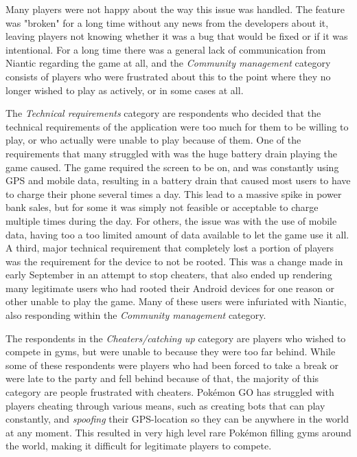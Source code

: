 Many players were not happy about the way this issue was handled. The feature was "broken" for a long time without any news from the developers about it, leaving players not knowing whether it was a bug that would be fixed or if it was intentional. For a long time there was a general lack of communication from Niantic regarding the game at all, and the \emph{Community management} category consists of players who were frustrated about this to the point where they no longer wished to play as actively, or in some cases at all.

The \emph{Technical requirements} category are respondents who decided that the technical requirements of the application were too much for them to be willing to play, or who actually were unable to play because of them. One of the requirements that many struggled with was the huge battery drain playing the game caused. The game required the screen to be on, and was constantly using GPS and mobile data, resulting in a battery drain that caused most users to have to charge their phone several times a day. This lead to a massive spike in power bank sales, but for some it was simply not feasible or acceptable to charge multiple times during the day. For others, the issue was with the use of mobile data, having too a too limited amount of data available to let the game use it all. A third, major technical requirement that completely lost a portion of players was the requirement for the device to not be rooted. This was a change made in early September in an attempt to stop cheaters, that also ended up rendering many legitimate users who had rooted their Android devices for one reason or other unable to play the game. Many of these users were infuriated with Niantic, also responding within the \emph{Community management} category.

The respondents in the \emph{Cheaters/catching up} category are players who wished to compete in gyms, but were unable to because they were too far behind. While some of these respondents were players who had been forced to take a break or were late to the party and fell behind because of that, the majority of this category are people frustrated with cheaters. Pokémon GO has struggled with players cheating through various means, such as creating bots that can play constantly, and \emph{spoofing} their GPS-location so they can be anywhere in the world at any moment. This resulted in very high level rare Pokémon filling gyms around the world, making it difficult for legitimate players to compete.

